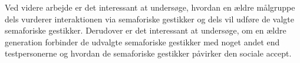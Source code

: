 Ved videre arbejde er det interessant at undersøge, hvordan en ældre målgruppe dels vurderer interaktionen via semaforiske gestikker og dels vil udføre de valgte semaforiske gestikker. Derudover er det interessant at undersøge, om en ældre generation forbinder de udvalgte semaforiske gestikker med noget andet end testpersonerne og hvordan de semaforiske gestikker påvirker den sociale accept. 
